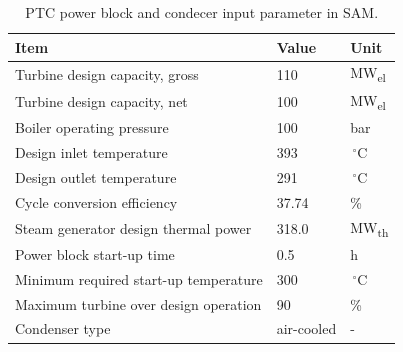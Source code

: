 \documentclass[Master,MEE,english]{twbook}%
\begin{document}
\begin{table}[!h]  
  \centering
	\begin{tabular}{  p{7.0cm}  C{2.0cm}  C{2.0cm} } 
	\hline	
\textbf{Item} & \textbf{Value} & \textbf{Unit} \\ \hline \hline
Turbine design capacity, gross  & 110 & MW\textsubscript{el} \\ 
Turbine design capacity, net & 100 & MW\textsubscript{el} \\ 
Boiler operating pressure & 100 & bar \\ 
Design inlet temperature & 393 & $\,^{\circ}\mathrm{C}$ \\ 
Design outlet temperature & 291 & $\,^{\circ}\mathrm{C}$ \\ 
Cycle conversion efficiency & 37.74 & \% \\ 
Steam generator design thermal power & 318.0 & MW\textsubscript{th}  \\
Power block start-up time & 0.5 & h \\ 
Minimum required start-up temperature & 300 & $\,^{\circ}\mathrm{C}$ \\
Maximum turbine over design operation & 90 & \%\\
Condenser type & air-cooled & - \\ 
\hline
\end{tabular}
\caption[PTC power block and condecer input parameter in SAM.]{PTC power block and condecer input parameter in SAM.}\label{tbl: PTCPowerplant}
\end{table}
\end{document}
